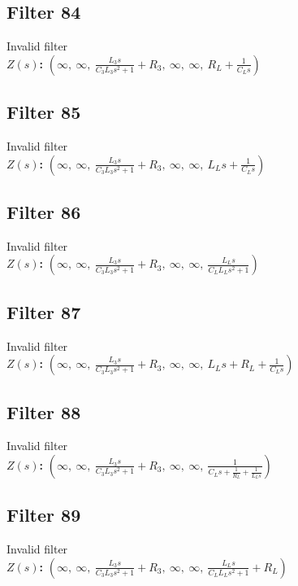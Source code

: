 \documentclass{article}
\begin{document}
\subsection*{Filter 84}
Invalid filter \\ 
\textbf{$Z(s)$:} $\left( \infty, \  \infty, \  \frac{L_{3} s}{C_{3} L_{3} s^{2} + 1} + R_{3}, \  \infty, \  \infty, \  R_{L} + \frac{1}{C_{L} s}\right)$ \\ 
\subsection*{Filter 85}
Invalid filter \\ 
\textbf{$Z(s)$:} $\left( \infty, \  \infty, \  \frac{L_{3} s}{C_{3} L_{3} s^{2} + 1} + R_{3}, \  \infty, \  \infty, \  L_{L} s + \frac{1}{C_{L} s}\right)$ \\ 
\subsection*{Filter 86}
Invalid filter \\ 
\textbf{$Z(s)$:} $\left( \infty, \  \infty, \  \frac{L_{3} s}{C_{3} L_{3} s^{2} + 1} + R_{3}, \  \infty, \  \infty, \  \frac{L_{L} s}{C_{L} L_{L} s^{2} + 1}\right)$ \\ 
\subsection*{Filter 87}
Invalid filter \\ 
\textbf{$Z(s)$:} $\left( \infty, \  \infty, \  \frac{L_{3} s}{C_{3} L_{3} s^{2} + 1} + R_{3}, \  \infty, \  \infty, \  L_{L} s + R_{L} + \frac{1}{C_{L} s}\right)$ \\ 
\subsection*{Filter 88}
Invalid filter \\ 
\textbf{$Z(s)$:} $\left( \infty, \  \infty, \  \frac{L_{3} s}{C_{3} L_{3} s^{2} + 1} + R_{3}, \  \infty, \  \infty, \  \frac{1}{C_{L} s + \frac{1}{R_{L}} + \frac{1}{L_{L} s}}\right)$ \\ 
\subsection*{Filter 89}
Invalid filter \\ 
\textbf{$Z(s)$:} $\left( \infty, \  \infty, \  \frac{L_{3} s}{C_{3} L_{3} s^{2} + 1} + R_{3}, \  \infty, \  \infty, \  \frac{L_{L} s}{C_{L} L_{L} s^{2} + 1} + R_{L}\right)$ \\ 
\end{document}

